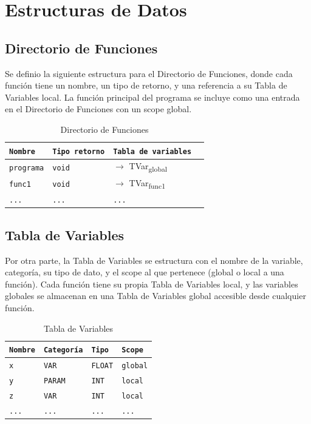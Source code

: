 \documentclass[12pt, letterpaper]{article}
\theoremstyle{definition}
\begin{document}
\section{Estructuras de Datos}

\subsection{Directorio de Funciones}

Se definio la siguiente estructura para el Directorio de Funciones, donde cada función tiene un nombre, un tipo de retorno, y una referencia a su Tabla de Variables local. La función principal del programa se incluye como una entrada en el Directorio de Funciones con un scope global.
\begin{table}[H]
\centering
\caption{Directorio de Funciones}
\label{tab:dirfuncs}
\begin{tabular}{|p{2.5cm}|p{2cm}|p{2.5cm}|p{4cm}|}
    \hline
    \texttt{Nombre} & \texttt{Tipo retorno} & \texttt{Tabla de variables}  \\
    \hline
    \texttt{programa} & \texttt{void} & $\rightarrow$ TVar\textsubscript{global}  \\ \hline
    \texttt{func1}    & \texttt{void} & $\rightarrow$ TVar\textsubscript{func1}  \\ \hline
    \texttt{...}      & \texttt{...}  & \texttt{...}  \\ \hline
\end{tabular}
\end{table}

\subsection{Tabla de Variables}

Por otra parte, la Tabla de Variables se estructura con el nombre de la variable, categoría, su tipo de dato, y el scope al que pertenece (global o local a una función). Cada función tiene su propia Tabla de Variables local, y las variables globales se almacenan en una Tabla de Variables global accesible desde cualquier función.
\begin{table}[H]
\centering
\caption{Tabla de Variables}
\label{tab:tabvars}
\begin{tabular}{|p{3cm}|p{2.5cm}|p{2.5cm}|p{3cm}|}
    \hline
    \texttt{Nombre} & \texttt{Categoría} & \texttt{Tipo} & \texttt{Scope}  \\
    \hline
    
    \texttt{x}   & \texttt{VAR} & \texttt{FLOAT} & \texttt{global}   \\ \hline
    \texttt{y}   & \texttt{PARAM} & \texttt{INT}   & \texttt{local}   \\ \hline
    \texttt{z}   & \texttt{VAR} & \texttt{INT}   & \texttt{local}   \\ \hline

    \texttt{...} & \texttt{...} & \texttt{...}   & \texttt{...}        \\ \hline
\end{tabular}
\end{table}
\end{document}
